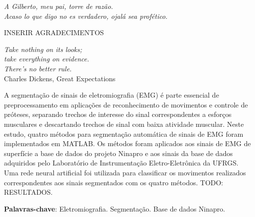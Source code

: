 \documentclass[
	12pt,				%
	openright,			%
	oneside,			%
	a4paper,			%
	english,			%
	francais,			%
	spanish,			%
	brazil				%
	]{abntex2}
\begin{document}
\begin{dedicatoria}
   \vspace*{\fill}
   \centering
   \noindent
   \textit{ A Gilberto, meu pai, torre de razão. \\ Acaso lo que digo no es verdadero, ojalá sea profético. } \vspace*{\fill}
\end{dedicatoria}

\begin{agradecimentos}
	INSERIR AGRADECIMENTOS
\end{agradecimentos}

\begin{epigrafe}
    \vspace*{\fill}
	\begin{flushright}
		\textit{Take nothing on its looks;\\ take everything on evidence.\\ There's no better rule.}\\ \vspace{\onelineskip}
		Charles Dickens, Great Expectations
	\end{flushright}
\end{epigrafe}


\setlength{\absparsep}{18pt} %
\begin{resumo}

	A segmentação de sinais de eletromiografia (EMG) é parte essencial de preprocessamento em aplicações de reconhecimento de movimentos e controle de próteses, separando trechos de interesse do sinal correspondentes a esforços musculares e descartando trechos de sinal com baixa atividade muscular. Neste estudo, quatro métodos para segmentação automática de sinais de EMG foram implementados em MATLAB. Os métodos foram aplicados aos sinais de EMG de superfície a base de dados do projeto Ninapro e aos sinais da base de dados adquiridos pelo Laboratório de Instrumentação Eletro-Eletrônica da UFRGS. Uma rede neural artificial foi utilizada para classificar os movimentos realizados correspondentes aos sinais segmentados com os quatro métodos. TODO: RESULTADOS.

	\vspace{\onelineskip}
	\textbf{Palavras-chave}: Eletromiografia. Segmentação. Base de dados Ninapro.
\end{resumo}
\end{document}
